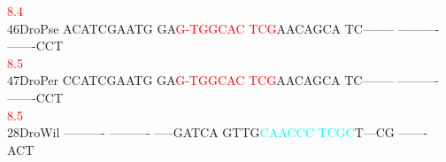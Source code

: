 \documentclass[11pt,twoside,reqno,a4paper]{article}
\begin{document}
{\hspace*{4\charwidth}\hspace*{7\charwidth}\hspace*{0\charwidth}\textcolor{red}{8.4}\hspace*{1\charwidth}\hspace*{1\charwidth}\hspace*{1\charwidth}\hspace*{1\charwidth}\hspace*{1\charwidth}\hspace*{1\charwidth}\\
46\hspace*{2\charwidth}DroPse	ACATCGAATG	GA\textcolor{red}{G}\textcolor{red}{-}\textcolor{red}{T}\textcolor{red}{G}\textcolor{red}{G}\textcolor{red}{C}\textcolor{red}{A}\textcolor{red}{C}	\textcolor{red}{T}\textcolor{red}{C}\textcolor{red}{G}AACAGCA	TC--------	----------	-------CCT	\\
\hspace*{4\charwidth}\hspace*{7\charwidth}\hspace*{1\charwidth}\hspace*{12\charwidth}\textcolor{red}{8.5}\hspace*{1\charwidth}\hspace*{1\charwidth}\hspace*{1\charwidth}\hspace*{1\charwidth}\hspace*{1\charwidth}\\
47\hspace*{2\charwidth}DroPer	CCATCGAATG	GA\textcolor{red}{G}\textcolor{red}{-}\textcolor{red}{T}\textcolor{red}{G}\textcolor{red}{G}\textcolor{red}{C}\textcolor{red}{A}\textcolor{red}{C}	\textcolor{red}{T}\textcolor{red}{C}\textcolor{red}{G}AACAGCA	TC--------	----------	-------CCT	\\
\hspace*{4\charwidth}\hspace*{7\charwidth}\hspace*{1\charwidth}\hspace*{12\charwidth}\textcolor{red}{8.5}\hspace*{1\charwidth}\hspace*{1\charwidth}\hspace*{1\charwidth}\hspace*{1\charwidth}\hspace*{1\charwidth}\\
28\hspace*{2\charwidth}DroWil	----------	----------	-----GATCA	GTTG\textcolor{cyan}{C}\textcolor{cyan}{A}\textcolor{cyan}{A}\textcolor{cyan}{C}\textcolor{cyan}{C}\textcolor{cyan}{C}	\textcolor{cyan}{T}\textcolor{cyan}{C}\textcolor{cyan}{G}\textcolor{cyan}{C}T---CG	-------ACT	\\
}
\end{document}
